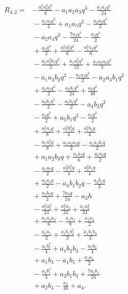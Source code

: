\begin{align*}
R_{4,2}={}&- \frac{a_{1}^{2} a_{2}^{2} q^{3}}{8} - a_{1} a_{2} a_{3} q^{3} - \frac{a_{1} a_{2} q^{3}}{24}\\
&{}- \frac{a_{1} a_{3} q^{3}}{2} + a_{1} a_{5} q^{3} - \frac{a_{2} a_{3} q^{3}}{2}\\
&{}- a_{2} a_{4} q^{3} - \frac{7 a_{3} q^{3}}{24} - \frac{a_{4} q^{3}}{2}\\
&{}+ \frac{a_{5} q^{3}}{2} + \frac{a_{1}^{2} a_{2}^{2} q^{2}}{6} - \frac{a_{1}^{2} a_{2} q^{2}}{6}\\
&{}- \frac{a_{1} a_{2}^{2} b_{1} q^{2}}{2} + \frac{a_{1} a_{2}^{2} q^{2}}{12} + \frac{a_{1} a_{2} a_{3} q^{2}}{3}\\
&{}- a_{1} a_{3} b_{2} q^{2} - \frac{a_{1} a_{3} q^{2}}{2} - a_{2} a_{3} b_{1} q^{2}\\
&{}+ \frac{a_{2} a_{3} q^{2}}{2} - \frac{a_{2} b_{1} q^{2}}{24} + \frac{a_{2} q^{2}}{48}\\
&{}- \frac{a_{3} b_{1} q^{2}}{2} - \frac{a_{3} b_{2} q^{2}}{2} - a_{4} b_{2} q^{2}\\
&{}- \frac{a_{4} q^{2}}{2} + a_{5} b_{1} q^{2} - \frac{a_{5} q^{2}}{2}\\
&{}+ \frac{a_{1}^{2} a_{2} q}{8} + \frac{a_{1}^{2} b_{2}^{2} q}{4} + \frac{a_{1}^{2} b_{2} q}{4}\\
&{}- \frac{a_{1} a_{2}^{2} q}{8} + \frac{a_{1} a_{2} a_{3} q}{2} - \frac{a_{1} a_{2} b_{1} q}{2}\\
&{}+ a_{1} a_{2} b_{3} q + \frac{a_{1} a_{2} q}{6} + \frac{a_{1} a_{3} q}{2}\\
&{}- \frac{a_{1} a_{5} q}{2} - \frac{a_{2}^{2} b_{1}^{2} q}{4} + \frac{a_{2}^{2} b_{1} q}{4}\\
&{}+ \frac{a_{2} a_{4} q}{2} - a_{3} b_{1} b_{2} q - \frac{a_{3} b_{1} q}{2}\\
&{}+ \frac{a_{3} b_{2} q}{2} + \frac{7 a_{3} q}{24} - a_{2} h\\
&{}- \frac{a_{1}^{2} a_{2}^{2}}{24} + \frac{a_{1}^{2} a_{2}}{24} + \frac{a_{1} a_{2}^{2}}{24}\\
&{}+ \frac{a_{1} a_{2} a_{3}}{6} - \frac{a_{1} a_{2}}{8} + \frac{a_{1} a_{3}}{2}\\
&{}- \frac{a_{1} a_{5}}{2} + \frac{a_{1} b_{1} b_{2}^{2}}{2} + \frac{a_{1} b_{1} b_{2}}{2}\\
&{}- \frac{a_{1} b_{2}^{2}}{4} + a_{1} b_{2} b_{3} - \frac{a_{1} b_{2}}{4}\\
&{}+ a_{1} b_{3} - a_{1} b_{5} + \frac{a_{2} a_{4}}{2}\\
&{}- \frac{a_{2} b_{1}^{2}}{4} + a_{2} b_{1} b_{3} + \frac{7 a_{2} b_{1}}{24}\\
&{}+ a_{2} b_{4} - \frac{a_{2}}{48} + a_{4}.
\end{align*}
